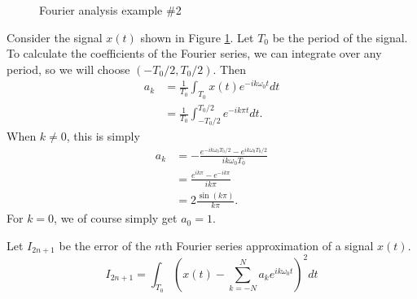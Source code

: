 \begin{exmp}
    \begin{figure}
        \centering
    \caption{Fourier analysis example \#2}
    \label{fig:fourier-step-example}
    \end{figure}

    Consider the signal $x(t)$ shown in Figure \ref{fig:fourier-step-example}. Let $T_0$ be the period of the signal. To calculate the coefficients of the Fourier series, we can integrate over any period, so we will choose $(-T_0/2, T_0/2)$. Then
    \begin{align*}
        a_k &= \frac{1}{T_0}\int_{T_0}x(t)e^{-ik\omega_0t}dt\\
        &= \frac{1}{T_0}\int_{-T_0/2}^{T_0/2}e^{-ik\pi t}dt.
    \end{align*}
    When $k \neq 0$, this is simply
    \begin{align*}
        a_k &= -\frac{e^{-ik\omega_0 T_0/2} - e^{ik\omega_0 T_0/2}}{ik\omega_0 T_0} \\
        &= \frac{e^{ik\pi} - e^{-ik\pi}}{ik\pi} \\
        &= 2\frac{\sin(k\pi)}{k\pi}.
    \end{align*}
    For $k = 0$, we of course simply get $a_0 = 1$.
\end{exmp}

\begin{defn}
    Let $I_{2n+1}$ be the error of the $n$th Fourier series approximation of a signal $x(t)$.
    \[I_{2n+1} = \int_{T_0}\left(x(t) - \sum_{k=-N}^{N}a_{k}e^{ik\omega_0t}\right)^2dt\]
\end{defn}

